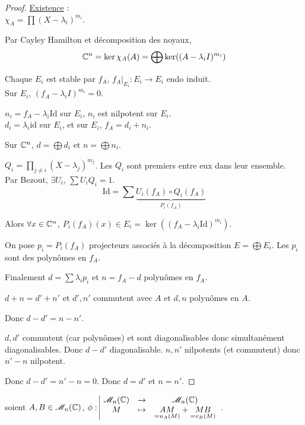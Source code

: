 \begin{proof}
    \uline{Existence} : \\
    $\displaystyle \chi_A = \prod (X - \lambda_i)^{m_i}$.
    
    Par Cayley Hamilton et décomposition des noyaux,
    \[ \mathbb{C}^n = \ker \chi_A(A) = \bigoplus \ker ((A - \lambda_i I)^{m_i}) \]
    
    Chaque $E_i$ est stable par $f_A$, $f_A|_{E_i} : E_i \to E_i$ endo induit. \\
    Sur $E_i$, $(f_A - \lambda_i I)^{m_i} = 0$.
    
    \avspace $n_i = f_A - \lambda_i \text{Id}$ sur $E_i$, $n_i$ est nilpotent sur $E_i$. \\
    $d_i = \lambda_i \text{id}$ sur $E_i$, et sur $E_i$, $f_A = d_i + n_i$.
    
    Sur $\mathbb{C}^n$, $d = \bigoplus d_i$ et $n = \bigoplus n_i$.
    
    \avspace $\displaystyle Q_i = \prod_{j \neq i} (X - \lambda_j)^{m_j}$. Les $Q_i$ sont premiers entre eux dans leur ensemble. \\
    Par Bezout, $\exists U_i, \, \sum U_i Q_i = 1$.
    \[ \text{Id} = \sum \underbrace{U_i(f_A) \circ Q_i(f_A)}_{P_i(f_A)} \]

    Alors $\forall x \in \mathbb{C}^n$, $P_i(f_A)(x) \in E_i = \ker((f_A - \lambda_i \text{Id})^{m_i})$.
    
    On pose $p_i = P_i(f_A)$ projecteurs associés à la décomposition $E = \bigoplus E_i$.
    Les $p_i$ sont des polynômes en $f_A$.

    \avspace Finalement $\displaystyle d = \sum \lambda_i p_i$ et $n = f_A - d$ polynômes en $f_A$.

    $d+n = d'+n'$ et $d', n'$ commutent avec $A$ et $d, n$ polynômes en $A$.

    Donc $d-d' = n-n'$.

    $d, d'$ commutent (car polynômes) et sont diagonalisables donc simultanément diagonalisables.
    Donc $d-d'$ diagonalisable.
    $n, n'$ nilpotents (et commutent) donc $n'-n$ nilpotent.

    Donc $d-d' = n'-n = 0$.
    Donc $d=d'$ et $n=n'$.
\end{proof}


 soient $A, B \in \mathscr M_n(\mathbb{C})$, $\phi: \space \begin{array}{|ccc} \displaystyle \mathscr M_n(\mathbb{C}) & \to & \displaystyle \mathscr M_n(\mathbb{C}) \\ \displaystyle M & \mapsto & \displaystyle \underset{= u_A(M)}{AM} + \underset{=v_B(M)}{MB} \end{array}$.

